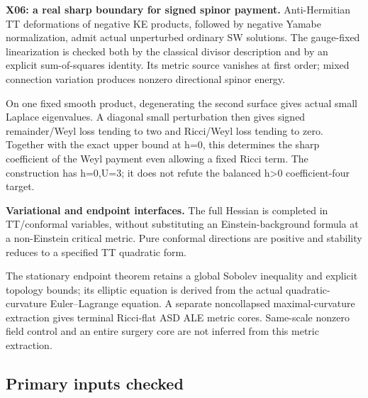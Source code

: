 \documentclass[
  10pt,
]{article}
\begin{document}
\textbf{X06: a real sharp boundary for signed spinor payment.}
Anti-Hermitian TT deformations of negative KE products, followed by
negative Yamabe normalization, admit actual unperturbed ordinary SW
solutions. The gauge-fixed linearization is checked both by the
classical divisor description and by an explicit sum-of-squares
identity. Its metric source vanishes at first order; mixed connection
variation produces nonzero directional spinor energy.

On one fixed smooth product, degenerating the second surface gives
actual small Laplace eigenvalues. A diagonal small perturbation then
gives signed remainder/Weyl loss tending to two and Ricci/Weyl loss
tending to zero. Together with the exact upper bound at h=0, this
determines the sharp coefficient of the Weyl payment even allowing a
fixed Ricci term. The construction has h=0,U=3; it does not refute the
balanced h\textgreater0 coefficient-four target.

\textbf{Variational and endpoint interfaces.} The full Hessian is
completed in TT/conformal variables, without substituting an
Einstein-background formula at a non-Einstein critical metric. Pure
conformal directions are positive and stability reduces to a specified
TT quadratic form.

The stationary endpoint theorem retains a global Sobolev inequality and
explicit topology bounds; its elliptic equation is derived from the
actual quadratic-curvature Euler--Lagrange equation. A separate
noncollapsed maximal-curvature extraction gives terminal Ricci-flat ASD
ALE metric cores. Same-scale nonzero field control and an entire surgery
core are not inferred from this metric extraction.

\hypertarget{primary-inputs-checked}{%
\subsection{Primary inputs checked}\label{primary-inputs-checked}}
\end{document}
